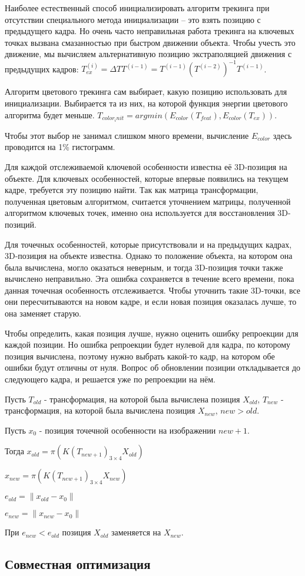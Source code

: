Наиболее естественный способ инициализировать алгоритм трекинга при отсутствии специального метода инициализации -- это взять позицию с предыдущего кадра. Но очень часто неправильная работа трекинга на ключевых точках вызвана смазанностью при быстром движении объекта. Чтобы учесть это движение, мы вычисляем альтернативную позицию экстраполяцией движения с предыдущих кадров: $T^{(i)}_{ex} = \Delta T T^{(i - 1)} = T^{(i - 1)}(T^{(i - 2)})^{-1} T^{(i - 1)}$.

Алгоритм цветового трекинга сам выбирает, какую позицию использовать для инициализации. Выбирается та из них, на которой функция энергии цветового алгоритма будет меньше. $T_{color_init} = argmin(E_{color}(T_{feat}), E_{color}(T_{ex}))$.

Чтобы этот выбор не занимал слишком много времени, вычисление $E_{color}$ здесь проводится на 1\% гистограмм.

Для каждой отслеживаемой ключевой особенности известна её 3D-позиция на объекте. Для ключевых особенностей, которые впервые появились на текущем кадре, требуется эту позицию найти. Так как матрица трансформации, полученная цветовым алгоритмом, считается уточнением матрицы, полученной алгоритмом ключевых точек, именно она используется для восстановления 3D-позиций.


Для точечных особенностей, которые присутствовали и на предыдущих кадрах, 3D-позиция на объекте известна. Однако то положение объекта, на котором она была вычислена, могло оказаться неверным, и тогда 3D-позиция точки также вычислено неправильно. Эта ошибка сохраняется в течение всего времени, пока данная точечная особенность отслеживается. Чтобы уточнить такие 3D-точки, все они пересчитываются на новом кадре, и если новая позиция оказалась лучше, то она заменяет старую.

Чтобы определить, какая позиция лучше, нужно оценить ошибку репроекции для каждой позиции. Но ошибка репроекции будет нулевой для кадра, по которому позиция вычислена, поэтому нужно выбрать какой-то кадр, на котором обе ошибки будут отличны от нуля. Вопрос об обновлении позиции откладывается до следующего кадра, и решается уже по репроекции на нём. 

Пусть $T_{old}$ - трансформация, на которой была вычислена позиция $X_{old}$, $T_{new}$ - трансформация, на которой была вычислена позиция $X_{new}$, $new > old$.

Пусть $x_0$ - позиция точечной особенности на изображении $new + 1$. 

Тогда $x_{old} = \pi (K (T_{new + 1})_{3 \times 4} X_{old})$

$x_{new} = \pi (K (T_{new + 1})_{3 \times 4} X_{new})$

$e_{old} = \| x_{old} - x_0 \|$

$e_{new} = \| x_{new} - x_0 \|$

При $e_{new} < e_{old}$ позиция $X_{old}$ заменяется на $X_{new}$.

\subsection{Совместная оптимизация}
